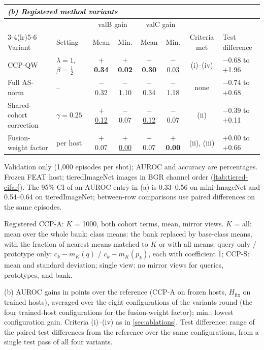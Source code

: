 \begin{table}[tbp]
\medskip
\begin{tabular}{llcccccl}
\multicolumn{8}{l}{\textit{(b) Registered method variants}} \\
\toprule
 & & \multicolumn{2}{c}{valB gain} & \multicolumn{2}{c}{valC gain} & & \\
\cmidrule(lr){3-4}\cmidrule(lr){5-6}
Variant & Setting & Mean & Min. & Mean & Min. & Criteria met & Test difference \\
\midrule
CCP-QW & $\lambda=1$, $\beta=\tfrac12$ & \textbf{\boldmath $+$0.34} & \textbf{\boldmath $+$0.02} & \textbf{\boldmath $+$0.30} & \underline{$-$0.03} & (i)--(iv) & $-$0.68 to $+$1.96 \\
Full AS-norm & -- & $-$0.32 & $-$1.10 & $-$0.34 & $-$1.18 & none & $-$0.74 to $+$0.68 \\
Shared-cohort correction & $\gamma=0.25$ & \underline{$+$0.12} & $-$0.07 & \underline{$+$0.12} & $-$0.07 & (ii) & $-$0.39 to $+$0.11 \\
Fusion-weight factor & per host & $+$0.07 & \underline{$+$0.00} & $+$0.07 & \textbf{\boldmath $+$0.00} & (ii), (iii) & $+$0.00 to $+$0.66 \\
\bottomrule
\end{tabular}
\par\smallskip
\begin{minipage}{\linewidth}\scriptsize
Validation only (1,000 episodes per shot); AUROC and accuracy are percentages. Frozen FEAT host; tieredImageNet images in BGR channel order (\cref{tab:tiered-cifar}). The 95\% CI of an AUROC entry in (a) is 0.33--0.56 on mini-ImageNet and 0.54--0.64 on tieredImageNet; between-row comparisons use paired differences on the same episodes.\par
Registered CCP-A: $K$ = 1000, both cohort terms, mean, mirror views. $K$ = all: mean over the whole bank; class means: the bank replaced by base-class means, with the fraction of nearest means matched to $K$ or with all means; query only / prototype only: $c_k-m_K(q)$ / $c_k-m_K(p_k)$, each with coefficient 1; CCP-S: mean and standard deviation; single view: no mirror views for queries, prototypes, and bank.\par
(b) AUROC gains in points over the reference (CCP-A on frozen hosts, $H_{\mathrm{fix}}$ on trained hosts), averaged over the eight configurations of the variants round (the four trained-host configurations for the fusion-weight factor); min.: lowest configuration gain. Criteria (i)--(iv) as in \cref{sec:ablations}. Test difference: range of the paired test differences from the reference over the same configurations, from a single test pass of all four variants.\par
\end{minipage}
\end{table}
